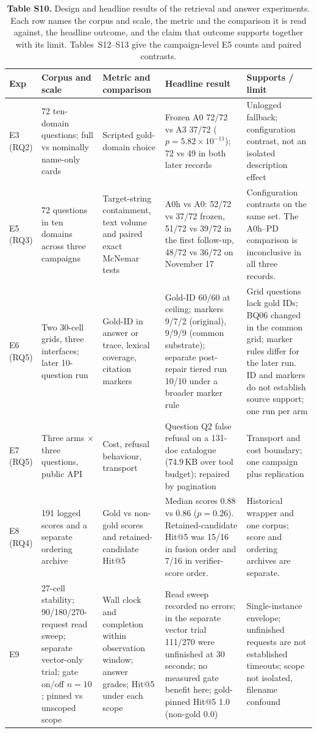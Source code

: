 \begin{table}
\centering
\footnotesize
\setlength{\tabcolsep}{4pt}
\caption{\textbf{Table S10.} Design and headline results of the retrieval and answer experiments.
Each row names the corpus and scale, the metric and the comparison it is read
against, the headline outcome, and the claim that outcome supports together
with its limit. Tables~S12--S13 give the campaign-level E5 counts and paired
contrasts.}

\begin{tabular}{@{}p{1.650cm}p{3.300cm}p{3.960cm}p{3.960cm}p{2.145cm}@{}}
\toprule
Exp & Corpus and scale & Metric and comparison & Headline result & Supports / limit\\
\midrule
E3 (RQ2) & 72 ten-domain questions; full vs nominally name-only cards & Scripted gold-domain choice & Frozen A0 72/72 vs A3 37/72 ($p=5.82\times10^{-11}$); 72 vs 49 in both later records & Unlogged fallback; configuration contrast, not an isolated description effect\\
E5 (RQ3) & 72 questions in ten domains across three campaigns & Target-string containment, text volume and paired exact McNemar tests & A0h vs A0: 52/72 vs 37/72 frozen, 51/72 vs 39/72 in the first follow-up, 48/72 vs 36/72 on November 17 & Configuration contrasts on the same set. The A0h--PD comparison is inconclusive in all three records.\\
E6 (RQ5) & Two 30-cell grids, three interfaces; later 10-question run & Gold-ID in answer or trace, lexical coverage, citation markers & Gold-ID 60/60 at ceiling; markers 9/7/2 (original), 9/9/9 (common substrate); separate post-repair tiered run 10/10 under a broader marker rule & Grid questions lack gold IDs; BQ06 changed in the common grid; marker rules differ for the later run. ID and markers do not establish source support; one run per arm\\
E7 (RQ5) & Three arms $\times$ three questions, public API & Cost, refusal behaviour, transport & Question Q2 false refusal on a 131-doc catalogue (74.9\,KB over tool budget); repaired by pagination & Transport and cost boundary; one campaign plus replication\\
E8 (RQ4) & 191 logged scores and a separate ordering archive & Gold vs non-gold scores and retained-candidate Hit@5 & Median scores 0.88 vs 0.86 ($p=0.26$). Retained-candidate Hit@5 was 15/16 in fusion order and 7/16 in verifier-score order. & Historical wrapper and one corpus; score and ordering archives are separate.\\
E9 & 27-cell stability; 90/180/270-request read sweep; separate vector-only trial; gate on/off $n=10$; pinned vs unscoped scope & Wall clock and completion within observation window; answer grades; Hit@5 under each scope & Read sweep recorded no errors; in the separate vector trial 111/270 were unfinished at 30 seconds; no measured gate benefit here; gold-pinned Hit@5 1.0 (non-gold 0.0) & Single-instance envelope; unfinished requests are not established timeouts; scope not isolated, filename confound\\
\bottomrule
\end{tabular}
\end{table}
